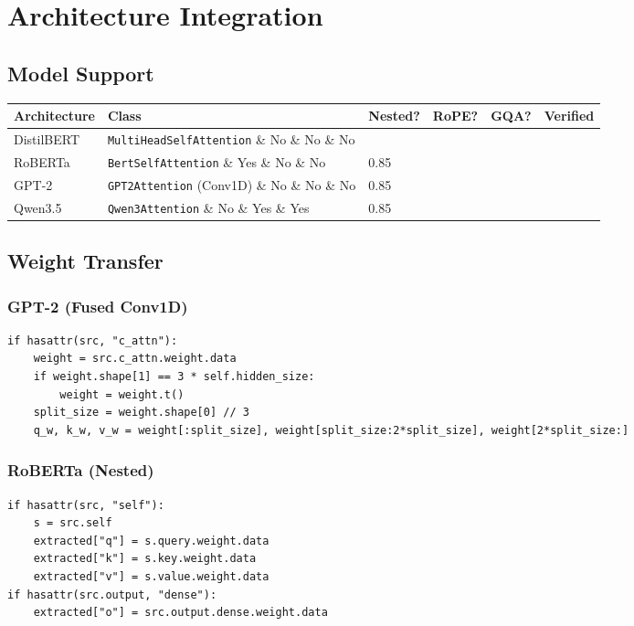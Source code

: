 
\section{Architecture Integration}

\subsection{Model Support}

\begin{table}[H]
\centering
\small
\begin{tabular}{llllll}
\toprule
\textbf{Architecture} & \textbf{Class} & \textbf{Nested?} & \textbf{RoPE?} & \textbf{GQA?} & \textbf{Verified} \\
\midrule
DistilBERT & \texttt{MultiHeadSelfAttention} \& No \& No \& No &  \\
RoBERTa & \texttt{BertSelfAttention} \& Yes \& No \& No & 0.85 \\
GPT-2 & \texttt{GPT2Attention} (Conv1D) \& No \& No \& No & 0.85 \\
Qwen3.5 & \texttt{Qwen3Attention} \& No \& Yes \& Yes & 0.85 \\
\bottomrule
\end{tabular}
\end{table}

\subsection{Weight Transfer}

\subsubsection{GPT-2 (Fused Conv1D)}

\begin{lstlisting}
if hasattr(src, "c_attn"):
    weight = src.c_attn.weight.data
    if weight.shape[1] == 3 * self.hidden_size:
        weight = weight.t()
    split_size = weight.shape[0] // 3
    q_w, k_w, v_w = weight[:split_size], weight[split_size:2*split_size], weight[2*split_size:]
\end{lstlisting}

\subsubsection{RoBERTa (Nested)}

\begin{lstlisting}
if hasattr(src, "self"):
    s = src.self
    extracted["q"] = s.query.weight.data
    extracted["k"] = s.key.weight.data
    extracted["v"] = s.value.weight.data
if hasattr(src.output, "dense"):
    extracted["o"] = src.output.dense.weight.data
\end{lstlisting}

